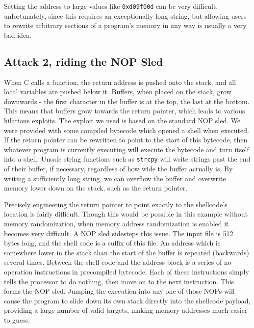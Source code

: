 
Setting the address to large values like {\tt 0xd09f00d} can be very difficult, unfortunately, since this requires an exceptionally long string, but allowing users to rewrite arbitrary sections of a program's memory in any way is usually a very bad idea.


\subsection{Attack 2, riding the NOP Sled}

When C calls a function, the return address is pushed onto the stack, and all local variables are pushed below it. Buffers, when placed on the stack, grow downwards - the first character in the buffer is at the top, the last at the bottom. This means that buffers grow towards the return pointer, which leads to various hilarious exploits. The exploit we used is based on the standard NOP sled. We were provided with some compiled bytecode which opened a shell when executed. If the return pointer can be rewritten to point to the start of this bytecode, then whatever program is currently executing will execute the bytecode and turn itself into a shell. Unsafe string functions such as {\tt strcpy} will write strings past the end of their buffer, if necessary, regardless of how wide the buffer actually is. By writing a sufficiently long string, we can overflow the buffer and overwrite memory lower down on the stack, such as the return pointer.

Precisely engineering the return pointer to point exactly to the shellcode's location is fairly difficult. Though this would be possible in this example without memory randomization, when memory address randomization is enabled it becomes very difficult. A NOP sled sidesteps this issue. The input file is 512 %
bytes long, and the shell code is a suffix of this file. An address which is somewhere lower in the stack than the start of the buffer is repeated (backwards) several times. Between the shell code and the address block is a series of no-operation instructions in precompiled bytecode. Each of these instructions simply tells the processor to do nothing, then move on to the next instruction. This forms the NOP sled. Jumping the execution into any one of those NOPs will cause the program to slide down its own stack directly into the shellcode payload, providing a large number of valid targets, making memory addresses much easier to guess.

